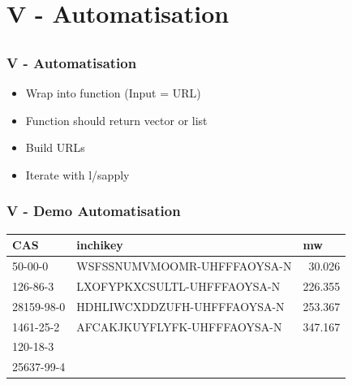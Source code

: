 \documentclass[12pt, t]{beamer}
\begin{document}
\section{V - Automatisation}
\subsection{}

\begin{frame}
  \frametitle{V - Automatisation}
  
  \begin{itemize}
    \item Wrap into function (Input = URL)
    \item Function should return vector or list
    \item Build URLs
    \item Iterate with l/sapply
  \end{itemize}

\end{frame}

\begin{frame}
  \frametitle{V - Demo Automatisation}
  \begin{adjustbox}{max totalsize={.9\textwidth}{.7\textheight},center}
  \end{adjustbox}
  
\vspace{1em}
\begin{table}[htbp]
\footnotesize
\begin{tabular}{llr}
CAS & inchikey & \multicolumn{1}{l}{mw} \\ \hline
50-00-0 & WSFSSNUMVMOOMR-UHFFFAOYSA-N & 30.026 \\ 
126-86-3 & LXOFYPKXCSULTL-UHFFFAOYSA-N & 226.355 \\ 
28159-98-0 & HDHLIWCXDDZUFH-UHFFFAOYSA-N & 253.367 \\ 
1461-25-2 & AFCAKJKUYFLYFK-UHFFFAOYSA-N & 347.167 \\ 
120-18-3 &  & \multicolumn{1}{l}{} \\ 
25637-99-4 &  & \multicolumn{1}{l}{} \\ \hline
\end{tabular}
\label{}
\end{table}

\end{frame}
\end{document}
